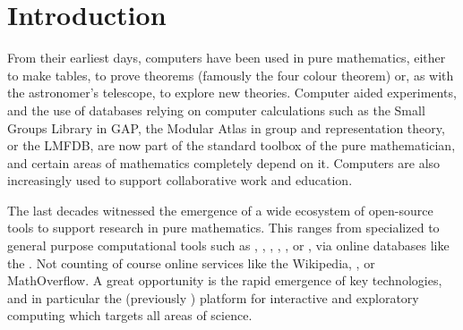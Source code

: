 \section{Introduction}

From their earliest days, computers have been used in pure mathematics, either to make
tables, to prove theorems (famously the four colour theorem) or, as with the astronomer's
telescope, to explore new theories. Computer aided experiments, and the use of databases
relying on computer calculations such as the Small Groups Library in GAP, the Modular
Atlas in group and representation theory, or the LMFDB, are now part of the standard
toolbox of the pure mathematician, and certain areas of mathematics completely depend on
it. Computers are also increasingly used to support collaborative work and education.

The last decades witnessed the emergence of a wide ecosystem of open-source tools to
support research in pure mathematics. This ranges from specialized to general purpose
computational tools such as \GAP, \PariGP, \Linbox, \MPIR, \Sage, or \Singular, via online
databases like the \LMFDB. Not counting of course online services like the Wikipedia,
\Arxiv, or MathOverflow. A great opportunity is the rapid emergence of key technologies,
and in particular the \Jupyter (previously \IPython) platform for interactive and
exploratory computing which targets all areas of science.

